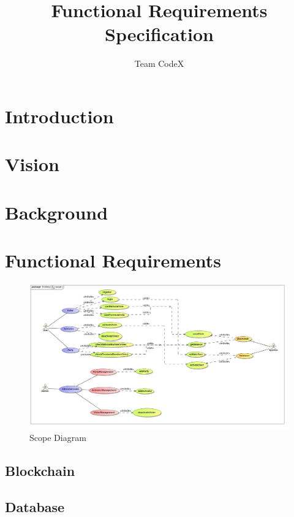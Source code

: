 \documentclass[11pt]{article}
\author{Team CodeX}
\title{Functional Requirements Specification}
\begin{document}
	\setlength{\parskip}{6pt}
	
	
	
	\tableofcontents
	\newpage
	
	\listoffigures
	\newpage
	
	\section{Introduction}
		
	
	\section{Vision}
		
	
	\section{Background}
		
		\newpage
		
	\section{Functional Requirements}
	\begin{figure}[H]
		\centering
		\includegraphics[width=\linewidth]{../Images/System/Scope.jpg}
		\caption{Scope Diagram}
	\end{figure}
	
	\newpage

	\subsection{Blockchain}
		
		
	\subsection{Database}
		
		\newpage
\end{document}
